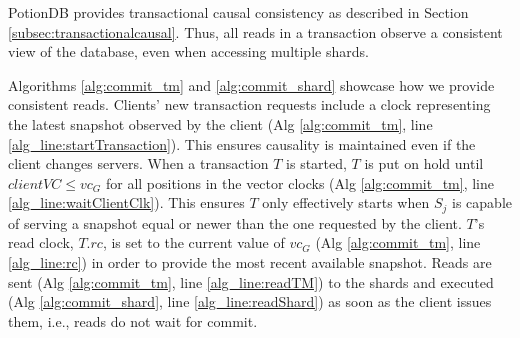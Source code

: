 \documentclass[sigconf, nonacm]{acmart}
\begin{document}
PotionDB provides transactional causal consistency as described in Section \ref{subsec:transactionalcausal}.
Thus, all reads in a transaction observe a consistent view of the database, even when accessing multiple shards.

Algorithms \ref{alg:commit_tm} and \ref{alg:commit_shard} showcase how we provide consistent reads.
Clients' new transaction requests include a clock representing the latest snapshot observed by the client (Alg \ref{alg:commit_tm}, line \ref{alg_line:startTransaction}). %
This ensures causality is maintained even if the client changes servers.
When a transaction $T$ is started, $T$ is put on hold until $\mathit{clientVC} \leq vc_G$ for all positions in the vector clocks (Alg \ref{alg:commit_tm}, line \ref{alg_line:waitClientClk}).
This ensures $T$ only effectively starts when $S_j$ is capable of serving a snapshot equal or newer than the one requested by the client.
$T$'s read clock, $T.rc$, is set to the current value of $vc_G$ (Alg \ref{alg:commit_tm}, line \ref{alg_line:rc}) in order to provide the most recent available snapshot.
Reads are sent (Alg \ref{alg:commit_tm}, line \ref{alg_line:readTM}) to the shards and executed (Alg \ref{alg:commit_shard}, line \ref{alg_line:readShard}) as soon as the client issues them, i.e., reads do not wait for commit.

\end{document}
